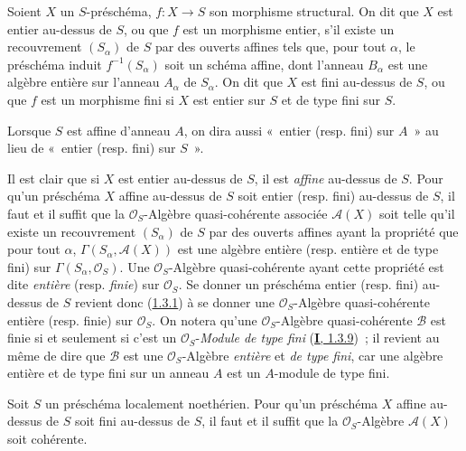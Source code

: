 \begin{definition}[6.1.1]
\label{II.6.1.1-fr}
Soient $X$ un $S$-préschéma, $f:X\to S$ son morphisme structural. On dit que
$X$ est entier au-dessus de $S$, ou que $f$ est un morphisme
entier, s'il existe un recouvrement $(S_\alpha)$ de $S$ par des ouverts
affines tels que, pour tout $\alpha$, le préschéma induit $f^{-1}(S_\alpha)$
soit un schéma affine, dont l'anneau $B_\alpha$ est une algèbre entière sur
l'anneau $A_\alpha$ de $S_\alpha$. On dit que $X$ est fini au-dessus de
$S$, ou que $f$ est un morphisme fini si $X$ est entier sur $S$ et de
type fini sur $S$.
\end{definition}

Lorsque $S$ est affine d'anneau $A$, on dira aussi «~entier (resp. fini) sur
$A$~» au lieu de «~entier (resp. fini) sur $S$~».

\begin{env}[6.1.2]
\label{II.6.1.2-fr}
Il est clair que si $X$ est entier au-dessus de $S$, il est \emph{affine} au-dessus
de $S$. Pour qu'un préschéma $X$ affine au-dessus de $S$ soit entier (resp.
fini) au-dessus de $S$, il faut et il suffit que la $\mathcal{O}_S$-Algèbre
quasi-cohérente associée $\mathcal{A}(X)$ soit telle qu'il existe un
recouvrement $(S_\alpha)$ de $S$ par des ouverts affines ayant la propriété
que pour tout $\alpha$, $\Gamma(S_\alpha,\mathcal{A}(X))$ est une algèbre
entière (resp. entière et de type fini) sur
$\Gamma(S_\alpha,\mathcal{O}_S)$. Une $\mathcal{O}_S$-Algèbre quasi-cohérente
ayant cette propriété est dite \emph{entière} (resp. \emph{finie}) sur
$\mathcal{O}_S$. Se donner un préschéma entier (resp. fini) au-dessus de $S$
revient donc (\hyperref[II.1.3.1-fr]{1.3.1}) à se donner une
$\mathcal{O}_S$-Algèbre quasi-cohérente entière (resp. finie) sur
$\mathcal{O}_S$. On notera qu'une $\mathcal{O}_S$-Algèbre quasi-cohérente
$\mathcal{B}$ est finie si et seulement si c'est un $\mathcal{O}_S$-\emph{Module de
type fini} (\hyperref[I.1.3.9-fr]{\textbf{I}, 1.3.9})~; il revient au même de dire que
$\mathcal{B}$ est une $\mathcal{O}_S$-Algèbre \emph{entière} et \emph{de type fini}, car une
algèbre entière et de type fini sur un anneau $A$ est un $A$-module de type
fini.
\end{env}

\begin{proposition}[6.1.3]
\label{II.6.1.3-fr}
Soit $S$ un préschéma localement noethérien. Pour qu'un préschéma $X$ affine
au-dessus de $S$ soit fini au-dessus de $S$, il faut et il suffit que la
$\mathcal{O}_S$-Algèbre $\mathcal{A}(X)$ soit cohérente.
\end{proposition}


